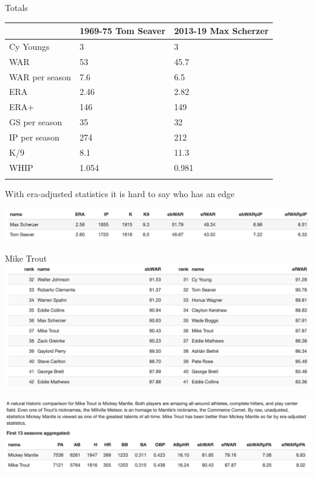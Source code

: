 \documentclass[
  ignorenonframetext,
]{beamer}
\begin{document}
\begin{frame}{Totals}
\protect\hypertarget{totals}{}
\begin{longtable}[]{@{}lll@{}}
\toprule\noalign{}
& 1969-75 Tom Seaver & 2013-19 Max Scherzer \\
\midrule\noalign{}
\endhead
Cy Youngs & 3 & 3 \\
WAR & 53 & 45.7 \\
WAR per season & 7.6 & 6.5 \\
ERA & 2.46 & 2.82 \\
ERA+ & 146 & 149 \\
GS per season & 35 & 32 \\
IP per season & 274 & 212 \\
K/9 & 8.1 & 11.3 \\
WHIP & 1.054 & 0.981 \\
\bottomrule\noalign{}
\end{longtable}
\end{frame}

\begin{frame}{}
\protect\hypertarget{section-15}{}
With era-adjusted statistics it is hard to say who has an edge

\vspace{12pt}

\includegraphics{SeavervScherzer.png}
\end{frame}

\begin{frame}{Mike Trout}
\protect\hypertarget{mike-trout}{}
\includegraphics{Trout-career-WAR.png}
\end{frame}

\begin{frame}{}
\protect\hypertarget{section-16}{}
\includegraphics{TroutvsMantle.png}
\end{frame}
\end{document}
